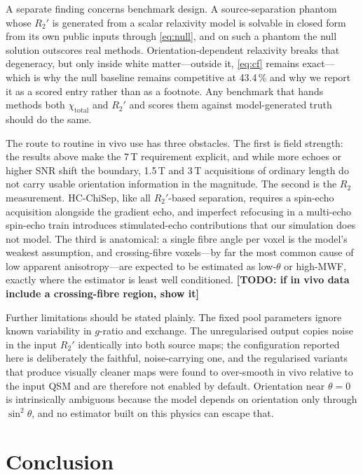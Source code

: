\documentclass[AMA,STIX2COL,Linenumberson]{MRM}
\newcommand{\TODO}[1]{{\color{red}\textbf{[TODO: #1]}}}
\newcommand{\TODO}[1]{}
\begin{document}
A separate finding concerns benchmark design. A source-separation phantom whose $R_2'$ is generated from a scalar relaxivity model is solvable in closed form from its own public inputs through \eqref{eq:null}, and on such a phantom the null solution outscores real methods. Orientation-dependent relaxivity breaks that degeneracy, but only inside white matter---outside it, \eqref{eq:cf} remains exact---which is why the null baseline remains competitive at 43.4\,\% and why we report it as a scored entry rather than as a footnote. Any benchmark that hands methods both $\chi_{\mathrm{total}}$ and $R_2'$ and scores them against model-generated truth should do the same.

The route to routine in vivo use has three obstacles. The first is field strength: the results above make the 7\,T requirement explicit, and while more echoes or higher SNR shift the boundary, 1.5\,T and 3\,T acquisitions of ordinary length do not carry usable orientation information in the magnitude. The second is the $R_2$ measurement. HC-ChiSep, like all $R_2'$-based separation, requires a spin-echo acquisition alongside the gradient echo, and imperfect refocusing in a multi-echo spin-echo train introduces stimulated-echo contributions that our simulation does not model. The third is anatomical: a single fibre angle per voxel is the model's weakest assumption, and crossing-fibre voxels---by far the most common cause of low apparent anisotropy---are expected to be estimated as low-$\theta$ or high-MWF, exactly where the estimator is least well conditioned. \TODO{if in vivo data include a crossing-fibre region, show it}

Further limitations should be stated plainly. The fixed pool parameters ignore known variability in $g$-ratio and exchange. The unregularised output copies noise in the input $R_2'$ identically into both source maps; the configuration reported here is deliberately the faithful, noise-carrying one, and the regularised variants that produce visually cleaner maps were found to over-smooth in vivo relative to the input QSM and are therefore not enabled by default. Orientation near $\theta=0$ is intrinsically ambiguous because the model depends on orientation only through $\sin^{2}\theta$, and no estimator built on this physics can escape that.


\section{Conclusion}
\end{document}
